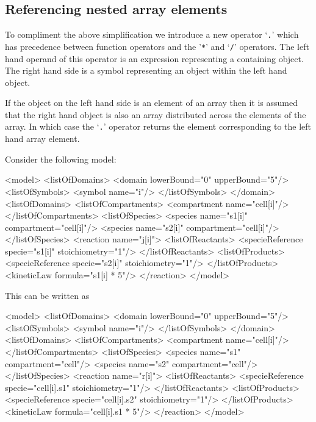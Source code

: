 \documentclass{cekarticle}
\begin{document}
\subsection{Referencing nested array elements}

To compliment the above simplification we introduce a new
operator `\texttt{.}' which has precedence between function
operators and the '\texttt{*}' and `\texttt{/}' operators. The
left hand operand of this operator is an expression representing
a containing object. The right hand side is a symbol representing
an object within the left hand object.

If the object on the left hand side is an element of an
array then it is assumed that the right hand object is also an array
distributed across the elements of the array. In which case
the `\texttt{.}' operator returns the element
corresponding to the left hand array element.

Consider the following model:

\begin{example}
<model>
    <listOfDomains>
        <domain lowerBound="0" upperBound="5"/>
            <listOfSymbols>
                <symbol name="i"/>
            </listOfSymbols>
        </domain>
    <listOfDomains>
    <listOfCompartments>
        <compartment name="cell[i]"/>
    </listOfCompartments>
    <listOfSpecies>
        <species name="s1[i]" compartment="cell[i]"/>
        <species name="s2[i]" compartment="cell[i]"/>
    </listOfSpecies>
    <reaction name="j[i]">
        <listOfReactants>
            <specieReference specie="s1[i]" stoichiometry="1"/>
        </listOfReactants>
        <listOfProducts>
            <specieReference specie="s2[i]" stoichiometry="1"/>
        </listOfProducts>
        <kineticLaw formula="s1[i] * 5"/>
    </reaction>
</model>
\end{example}
This can be written as
\begin{example}
<model>
    <listOfDomains>
        <domain lowerBound="0" upperBound="5"/>
            <listOfSymbols>
                <symbol name="i"/>
            </listOfSymbols>
        </domain>
    <listOfDomains>
    <listOfCompartments>
        <compartment name="cell[i]"/>
    </listOfCompartments>
    <listOfSpecies>
        <species name="s1" compartment="cell"/>
        <species name="s2" compartment="cell"/>
    </listOfSpecies>
    <reaction name="r[i]">
        <listOfReactants>
            <specieReference specie="cell[i].s1" stoichiometry="1"/>
        </listOfReactants>
        <listOfProducts>
            <specieReference specie="cell[i].s2" stoichiometry="1"/>
        </listOfProducts>
        <kineticLaw formula="cell[i].s1 * 5"/>
    </reaction>
</model>
\end{example}
\end{document}
